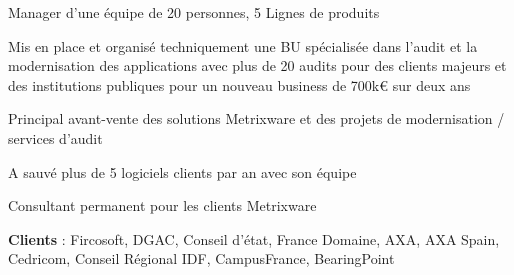 \begin{cventries}
{\begin{cvitems}
        \item {Manager d'une équipe de 20 personnes, 5 Lignes de produits}
        \item {Mis en place et organisé techniquement une BU spécialisée dans l'audit et la modernisation des applications avec plus de 20 audits pour des clients majeurs et des institutions publiques pour un nouveau business de 700k€ sur deux ans}
        \item {Principal avant-vente des solutions Metrixware et des projets de modernisation / services d'audit}
        \item {A sauvé plus de 5 logiciels clients par an avec son équipe}
        \item {Consultant permanent pour les clients Metrixware}
        \item {\textbf{Clients} : Fircosoft, DGAC, Conseil d'état, France Domaine, AXA, AXA Spain, Cedricom, Conseil Régional IDF, CampusFrance, BearingPoint}
      \end{cvitems}
    }


\end{cventries}
